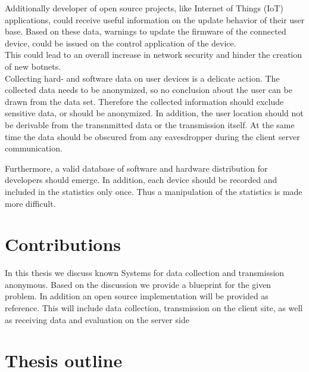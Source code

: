 Additionally developer of open source projects, like Internet of Things (IoT) applications, could receive useful
information on the update behavior of their user base. Based on these data, warnings to update the firmware of the
connected device, could be issued on the control application of the device.\\
This could lead to an overall increase in network security and hinder the creation of new botnets.\\

Collecting hard- and software data on user devices is a delicate action. The collected data needs to be anonymized,
so no conclusion about the user can be drawn from the data set. Therefore the collected information should exclude
sensitive data, or should be anonymized. 
In addition, the user location should not be derivable from the transnmitted data or the transmission itself. At the same time the data should be obscured from any eavesdropper during the client server communication.

Furthermore, a valid database of software and hardware distribution for developers should emerge. In addition,
each device should be recorded and included in the statistics only once.
Thus a manipulation of the statistics is made more difficult.



\section{Contributions}
\label{sec:intro:contrib}
%

In this thesis we discuss known Systems for data collection and transmission anonymous. Based on the discussion we provide a blueprint for the given problem. In addition an open source implementation will be provided as reference.
This will include data collection, transmission on the client site, as well as receiving data and evaluation on the server side

\section{Thesis outline}
\label{sec:intro:outline}


